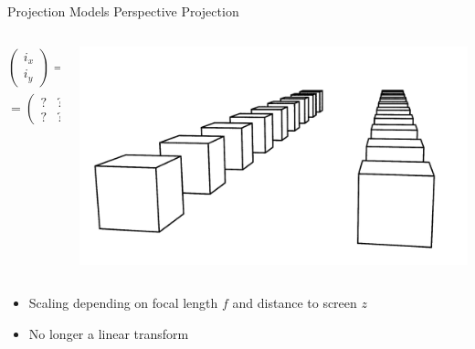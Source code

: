 \begin{frame}[t]{Projection Models}
	Perspective Projection
	\begin{columns}[c, onlytextwidth]
		\begin{column}{0.5\textwidth}
			\vspace{1cm}
			$$\left(\begin{array}{c}i_x \\i_y\end{array}\right) =\left(\begin{array}{c} \frac{f\cdot x}{z} \\\frac{f\cdot y}{z}\end{array}\right) $$
			$$= \left(\begin{array}{ccc} ? &? &?\\ ?&?&?\end{array}\right) \left(\begin{array}{c}x\\y\\z\end{array}\right)$$
			\vspace{1cm}
		\end{column}\begin{column}{0.5\textwidth}
			\includegraphics[width=\textwidth]{images/perspective.png}
		\end{column}
	\end{columns}

	\begin{itemize}
		\item Scaling depending on focal length $f$ and distance to screen $z$
		\item No longer a linear transform
	\end{itemize}
\end{frame}

